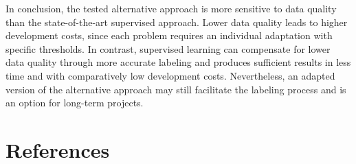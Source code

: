 \documentclass[12pt, a4paper]{article}
\begin{document}
In conclusion, the tested alternative approach is more sensitive to data quality than the state-of-the-art supervised approach. Lower data quality leads to higher development costs, since each problem requires an individual adaptation with specific thresholds. In contrast, supervised learning can compensate for lower data quality through more accurate labeling and produces sufficient results in less time and with comparatively low development costs. Nevertheless, an adapted version of the alternative approach may still facilitate the labeling process and is an option for long-term projects.

\section{References}
\printbibliography[heading=none]
\end{document}
